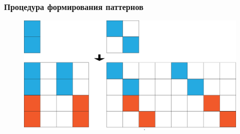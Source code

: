 \begin{frame}
\frametitle{Процедура формирования паттернов}
  \begin{figure}
  \centering
    \includegraphics[width=1\textwidth]{../Dissertation/images/part1_img/hough_proc}
  \end{figure}
\end{frame}



